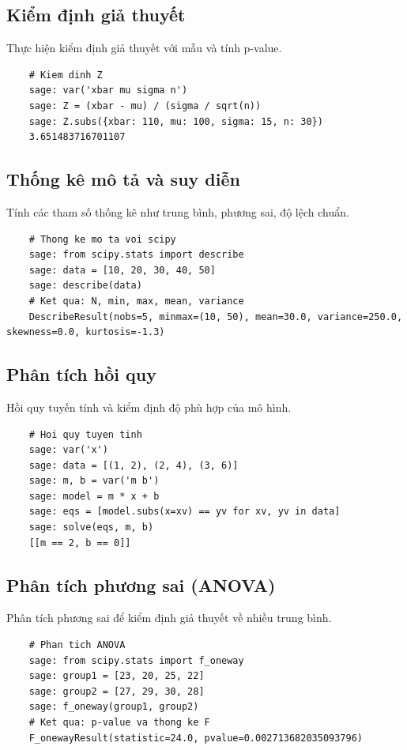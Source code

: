 \subsection{Kiểm định giả thuyết}
Thực hiện kiểm định giả thuyết với mẫu và tính p-value.

\begin{lstlisting}
	# Kiem dinh Z
	sage: var('xbar mu sigma n')
	sage: Z = (xbar - mu) / (sigma / sqrt(n))
	sage: Z.subs({xbar: 110, mu: 100, sigma: 15, n: 30})
	3.651483716701107
\end{lstlisting}

\subsection{Thống kê mô tả và suy diễn}
Tính các tham số thống kê như trung bình, phương sai, độ lệch chuẩn.

\begin{lstlisting}
	# Thong ke mo ta voi scipy
	sage: from scipy.stats import describe
	sage: data = [10, 20, 30, 40, 50]
	sage: describe(data)
	# Ket qua: N, min, max, mean, variance
	DescribeResult(nobs=5, minmax=(10, 50), mean=30.0, variance=250.0, skewness=0.0, kurtosis=-1.3)
\end{lstlisting}

\subsection{Phân tích hồi quy}
Hồi quy tuyến tính và kiểm định độ phù hợp của mô hình.

\begin{lstlisting}
	# Hoi quy tuyen tinh
	sage: var('x')
	sage: data = [(1, 2), (2, 4), (3, 6)]
	sage: m, b = var('m b')
	sage: model = m * x + b
	sage: eqs = [model.subs(x=xv) == yv for xv, yv in data]
	sage: solve(eqs, m, b)
	[[m == 2, b == 0]]
\end{lstlisting}

\subsection{Phân tích phương sai (ANOVA)}
Phân tích phương sai để kiểm định giả thuyết về nhiều trung bình.

\begin{lstlisting}
	# Phan tich ANOVA
	sage: from scipy.stats import f_oneway
	sage: group1 = [23, 20, 25, 22]
	sage: group2 = [27, 29, 30, 28]
	sage: f_oneway(group1, group2)
	# Ket qua: p-value va thong ke F
	F_onewayResult(statistic=24.0, pvalue=0.002713682035093796)
\end{lstlisting}
